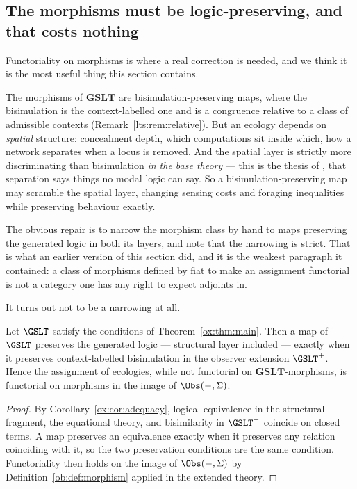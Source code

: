 \subsection{The morphisms must be logic-preserving, and that costs nothing}\label{sci:S15.3}

Functoriality on morphisms is where a real correction is needed, and we think it is the most useful
thing this section contains.

The morphisms of $\mathbf{GSLT}$ are bisimulation-preserving maps, where the bisimulation is the
context-labelled one and is a congruence relative to a class of admissible contexts
(Remark~\ref{lts:rem:relative}). But an ecology depends on \emph{spatial} structure: concealment
depth, which computations sit inside which, how a network separates when a locus is removed. And the
spatial layer is strictly more discriminating than bisimulation \emph{in the base theory} --- this is
the thesis of \cite{ClassifierNote}, that separation says things no modal logic can say. So a
bisimulation-preserving map may scramble the spatial layer, changing sensing costs and foraging
inequalities while preserving behaviour exactly.

The obvious repair is to narrow the morphism class by hand to maps preserving the generated logic in
both its layers, and note that the narrowing is strict. That is what an earlier version of this
section did, and it is the weakest paragraph it contained: a class of morphisms defined by fiat to
make an assignment functorial is not a category one has any right to expect adjoints in.

It turns out not to be a narrowing at all.

\begin{proposition}
\label{sci:prop:morphisms}
Let $\GSLT$ satisfy the conditions of Theorem~\ref{ox:thm:main}. Then a map of $\GSLT$ preserves the
generated logic --- structural layer included --- exactly when it preserves context-labelled
bisimulation in the observer extension $\GSLT^{+}$. Hence the assignment of ecologies, while not
functorial on $\mathbf{GSLT}$-morphisms, is functorial on morphisms in the image of
$\Obs(-,\Sigma)$.
\end{proposition}

\begin{proof}
By Corollary~\ref{ox:cor:adequacy}, logical equivalence in the structural fragment, the equational
theory, and bisimilarity in $\GSLT^{+}$ coincide on closed terms. A map preserves an equivalence
exactly when it preserves any relation coinciding with it, so the two preservation conditions are the
same condition. Functoriality then holds on the image of $\Obs(-,\Sigma)$ by
Definition~\ref{ob:def:morphism} applied in the extended theory.
\end{proof}

